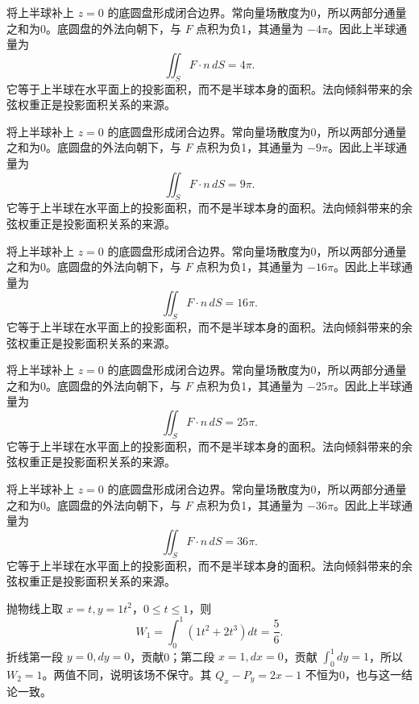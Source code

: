 \documentclass[UTF8,12pt,a4paper,fontset=fandol]{ctexart}
\begin{document}
\begin{solve}\label{ans:c42q14}
将上半球补上 $z=0$ 的底圆盘形成闭合边界。常向量场散度为0，所以两部分通量之和为0。底圆盘的外法向朝下，与 $F$ 点积为负1，其通量为 $-4\pi$。因此上半球通量为
\[
\iint_SF\cdot n\,dS=4\pi.
\]
它等于上半球在水平面上的投影面积，而不是半球本身的面积。法向倾斜带来的余弦权重正是投影面积关系的来源。
\end{solve}

\begin{solve}\label{ans:c42q15}
将上半球补上 $z=0$ 的底圆盘形成闭合边界。常向量场散度为0，所以两部分通量之和为0。底圆盘的外法向朝下，与 $F$ 点积为负1，其通量为 $-9\pi$。因此上半球通量为
\[
\iint_SF\cdot n\,dS=9\pi.
\]
它等于上半球在水平面上的投影面积，而不是半球本身的面积。法向倾斜带来的余弦权重正是投影面积关系的来源。
\end{solve}

\begin{solve}\label{ans:c42q16}
将上半球补上 $z=0$ 的底圆盘形成闭合边界。常向量场散度为0，所以两部分通量之和为0。底圆盘的外法向朝下，与 $F$ 点积为负1，其通量为 $-16\pi$。因此上半球通量为
\[
\iint_SF\cdot n\,dS=16\pi.
\]
它等于上半球在水平面上的投影面积，而不是半球本身的面积。法向倾斜带来的余弦权重正是投影面积关系的来源。
\end{solve}

\begin{solve}\label{ans:c42q17}
将上半球补上 $z=0$ 的底圆盘形成闭合边界。常向量场散度为0，所以两部分通量之和为0。底圆盘的外法向朝下，与 $F$ 点积为负1，其通量为 $-25\pi$。因此上半球通量为
\[
\iint_SF\cdot n\,dS=25\pi.
\]
它等于上半球在水平面上的投影面积，而不是半球本身的面积。法向倾斜带来的余弦权重正是投影面积关系的来源。
\end{solve}

\begin{solve}\label{ans:c42q18}
将上半球补上 $z=0$ 的底圆盘形成闭合边界。常向量场散度为0，所以两部分通量之和为0。底圆盘的外法向朝下，与 $F$ 点积为负1，其通量为 $-36\pi$。因此上半球通量为
\[
\iint_SF\cdot n\,dS=36\pi.
\]
它等于上半球在水平面上的投影面积，而不是半球本身的面积。法向倾斜带来的余弦权重正是投影面积关系的来源。
\end{solve}

\begin{solve}\label{ans:c42q19}
抛物线上取 $x=t,y=1t^2$，$0\le t\le1$，则
\[
W_1=\int_0^1(1t^2+2t^3)dt=\frac{5}{6}.
\]
折线第一段 $y=0,dy=0$，贡献0；第二段 $x=1,dx=0$，贡献 $\int_0^{1}dy=1$，所以 $W_2=1$。两值不同，说明该场不保守。其 $Q_x-P_y=2x-1$ 不恒为0，也与这一结论一致。
\end{solve}
\end{document}
